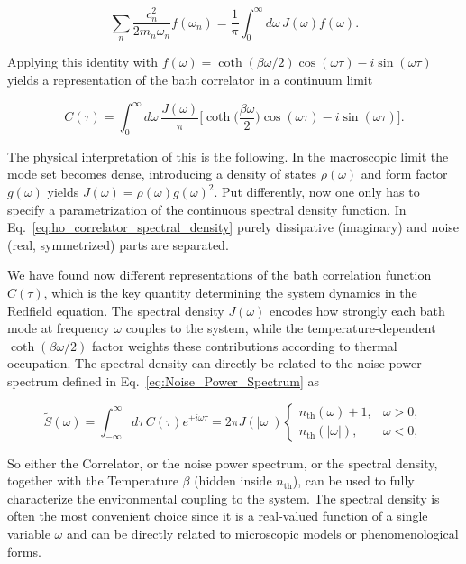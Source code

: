 \begin{equation}
	\sum_{n} \frac{c_n^2}{2 m_n \omega_n} f(\omega_n) = \frac{1}{\pi} \int_{0}^{\infty} d\omega\, J(\omega) f(\omega).
\end{equation}

\noindent
Applying this identity with $f(\omega) = \coth(\beta \omega / 2) \cos(\omega \tau) - i \sin(\omega \tau)$ yields a representation of the bath correlator in a continuum limit

\begin{equation} \label{eq:ho_correlator_spectral_density}
	C(\tau) = \int_{0}^{\infty} d\omega \, \frac{J(\omega)}{\pi} \Big[ \coth\Big(\frac{\beta \omega}{2}\Big) \cos(\omega \tau) - i \sin(\omega \tau) \Big].
\end{equation}


\noindent
The physical interpretation of this is the following.
In the macroscopic limit the mode set becomes dense, introducing a density of states $\rho(\omega)$ and form factor $g(\omega)$ yields $J(\omega)=\rho(\omega) g(\omega)^2$. Put differently, now one only has to specify a parametrization of the continuous spectral density function. In Eq.~\eqref{eq:ho_correlator_spectral_density} purely dissipative (imaginary) and noise (real, symmetrized) parts are separated.

\vspace{1em}
\noindent
We have found now different representations of the bath correlation function $C(\tau)$, which is the key quantity determining the system dynamics in the Redfield equation. The spectral density $J(\omega)$ encodes how strongly each bath mode at frequency $\omega$ couples to the system, while the temperature-dependent $\coth(\beta \omega / 2)$ factor weights these contributions according to thermal occupation. The spectral density can directly be related to the noise power spectrum defined in Eq.~\eqref{eq:Noise_Power_Spectrum} as

\begin{equation} \label{eq:ho_correlator_final}
	\tilde{S}(\omega) = \int_{-\infty}^{\infty} d\tau \, C(\tau) e^{+i \omega \tau} = 2\pi J(|\omega|) \begin{cases} n_{\text{th}}(\omega)+1, & \omega>0, \\ n_{\text{th}}(|\omega|), & \omega<0, \end{cases}
\end{equation}

\noindent
So either the Correlator, or the noise power spectrum, or the spectral density, together with the Temperature $\beta$ (hidden inside $n_{\text{th}}$), can be used to fully characterize the environmental coupling to the system. The spectral density is often the most convenient choice since it is a real-valued function of a single variable $\omega$ and can be directly related to microscopic models or phenomenological forms.

